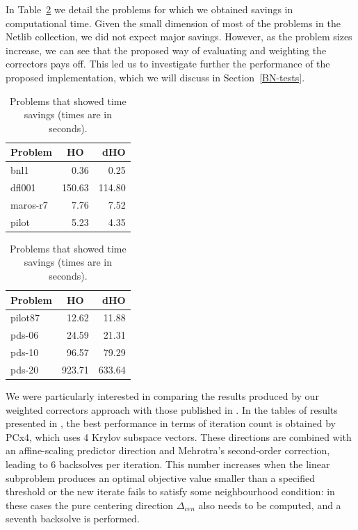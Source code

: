 In Table~\ref{TimeML} we detail the problems for which we obtained savings 
in computational time. Given the small dimension of most of the problems 
in the Netlib collection, we did not expect major savings. However, as the
problem sizes increase, we can see that the proposed way of evaluating and
weighting the correctors pays off. This led us to investigate further 
the performance of the proposed implementation, which we will discuss
in Section~\ref{BN-tests}.
%
\begin{table}[ht]
  \centering
  \begin{minipage}[t]{0.36\textwidth}
    \begin{tabular}{|l|r|r|}\hline
      Problem & \multicolumn{1}{c|}{HO} & dHO \\ \hline
      bnl1    &   0.36 &   0.25 \\
      d{f}l001& 150.63 & 114.80 \\
      maros-r7&   7.76 &   7.52 \\
      pilot   &   5.23 &   4.35 \\ \hline
    \end{tabular}
  \end{minipage}
  \begin{minipage}[t]{0.36\textwidth}
    \begin{tabular}{|l|r|r|}\hline
      Problem & \multicolumn{1}{c|}{HO} & dHO\\ \hline
      pilot87 &  12.62 &  11.88 \\ 
      pds-06  &  24.59 &  21.31 \\
      pds-10  &  96.57 &  79.29 \\
      pds-20  & 923.71 & 633.64 \\ \hline
    \end{tabular}
  \end{minipage}
  \caption{Problems that showed time savings (times are in seconds).}
  \label{TimeML}
\end{table}

We were particularly interested in comparing the results produced by our 
weighted correctors approach with those published in \cite{MehrotraLi}. 
%
%
In the tables of results presented in \cite{MehrotraLi}, the best 
performance in terms of iteration count is obtained by PCx4, which 
uses 4 Krylov subspace vectors. These directions are combined with 
an affine-scaling predictor direction and Mehrotra's second-order 
correction, leading to 6 backsolves per iteration. 
This number increases when the linear subproblem produces an optimal 
objective value smaller than a specified threshold or the new iterate 
fails to satisfy some neighbourhood condition: in these cases 
the pure centering direction $\Delta_{cen}$ also needs to be computed,
and a seventh backsolve is performed.

